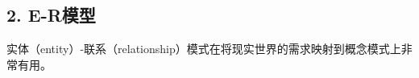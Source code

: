 \documentclass[aspectratio=169, 14pt]{beamer}
\begin{document}
%
%
%
%
%
%
%
%
%


\begin{frame}
    \section{\textcolor{darkmidnightblue}{2. E-R模型}}
    实体（entity）-联系（relationship）模式在将现实世界的需求映射到概念模式上非常有用。
\end{frame}
\end{document}
